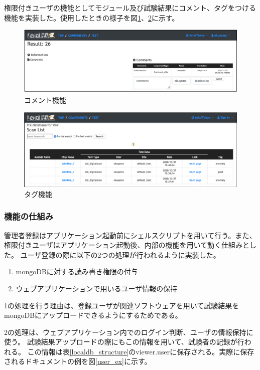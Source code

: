 権限付きユーザの機能としてモジュール及び試験結果にコメント、タグをつける機能を実装した。使用したときの様子を図\ref{webapp_comment}、\ref{webapp_tag}に示す。

\begin{figure}[bpt]\centering
\includegraphics[width=12cm]{viewer_comment}
\caption[コメント機能]{コメント機能}
\label{webapp_comment}
\end{figure}

\begin{figure}[bpt]\centering
\includegraphics[width=12cm]{viewer_tag}
\caption[タグ機能]{タグ機能}
\label{webapp_tag}
\end{figure}

\subsubsection{機能の仕組み}
管理者登録はアプリケーション起動前にシェルスクリプトを用いて行う。また、権限付きユーザはアプリケーション起動後、内部の機能を用いて動く仕組みとした。
ユーザ登録の際に以下の2つの処理が行われるように実装した。

\begin{enumerate}
  \item mongoDBに対する読み書き権限の付与
  \item ウェブアプリケーションで用いるユーザ情報の保持
\end{enumerate}

1の処理を行う理由は、登録ユーザが関連ソフトウェアを用いて試験結果をmongoDBにアップロードできるようにするためである。

2の処理は、ウェブアプリケーション内でのログイン判断、ユーザの情報保持に使う。
試験結果アップロードの際にもこの情報を用いて、試験者の記録が行われる。
この情報は表\ref{localdb_structure}のviewer.userに保存される。実際に保存されるドキュメントの例を図\ref{user_ex}に示す。

